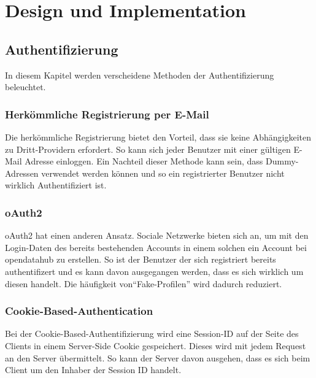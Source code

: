 \chapter{Design und Implementation}
\section{Authentifizierung}
\xxx[@rliebi: kapitel design = IST zustand. hier hat es vergleiche]
In diesem Kapitel werden verscheidene Methoden der Authentifizierung beleuchtet.
\subsection{Herkömmliche Registrierung per E-Mail}
Die herkömmliche Registrierung bietet den Vorteil, dass sie keine Abhängigkeiten zu Dritt-Providern erfordert. So kann sich jeder Benutzer mit einer gültigen E-Mail Adresse einloggen. Ein Nachteil dieser Methode kann sein, dass Dummy-Adressen verwendet werden können und so ein registrierter Benutzer nicht wirklich Authentifiziert ist.
\subsection{oAuth2}
oAuth2 hat einen anderen Ansatz. Sociale Netzwerke bieten sich an, um mit den Login-Daten des bereits bestehenden Accounts in einem solchen ein Account bei opendatahub zu erstellen. So ist der Benutzer der sich registriert bereits authentifizert und es kann davon ausgegangen werden, dass es sich wirklich um diesen handelt. Die häufigkeit von``Fake-Profilen'' wird dadurch reduziert.

\subsection{Cookie-Based-Authentication}
Bei der Cookie-Based-Authentifizierung wird eine Session-ID auf der Seite des Clients in einem Server-Side Cookie gespeichert. Dieses wird mit jedem Request an den Server übermittelt. So kann der Server davon ausgehen, dass es sich beim Client um den Inhaber der Session ID handelt.


